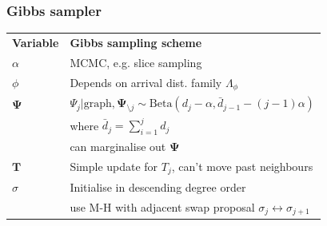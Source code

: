 \documentclass[final,hyperref={pdfpagelabels=false},noamsthm]{beamer}
\newcommand{\bfT}{\mathbf{T}}
\newcommand{\bfPsi}{\boldsymbol{\Psi}}
\begin{document}
\begin{frame}
	\frametitle{Gibbs sampler}
	\begin{center}
		\begin{tabular}{l|l}
			\textbf{Variable} & \textbf{Gibbs sampling scheme} \\
			\Xhline{4\arrayrulewidth}
			\rule{0pt}{3ex}
			$\alpha$ & MCMC, e.g. slice sampling \\
			\hline
			\rule{0pt}{3ex}
			$\phi$ & Depends on arrival dist. family $\Lambda_\phi$ \\
			\hline
			\rule{0pt}{3ex}
			$\mathbf{\Psi}$ & $\Psi_j | \text{graph}, \mathbf{\Psi}_{\setminus j} \sim \text{Beta}(d_{j} - \alpha, \bar{d}_{j-1} - (j-1)\alpha)$ \\
			& \quad where $\bar{d}_{j} = \sum_{i=1}^j d_{j}$ \\
			& \quad can marginalise out $\bfPsi$ \\
			\hline
			\rule{0pt}{3ex}
			$\mathbf{T}$ & Simple update for $T_j$, can't move past neighbours \\
			\hline
			\rule{0pt}{3ex}
			$\sigma$ & Initialise in descending degree order \\
			& \quad use M-H with adjacent swap proposal $\sigma_j \leftrightarrow \sigma_{j+1}$
		\end{tabular}
	\end{center}
\end{frame}

%
%
%
%
%
\end{document}
